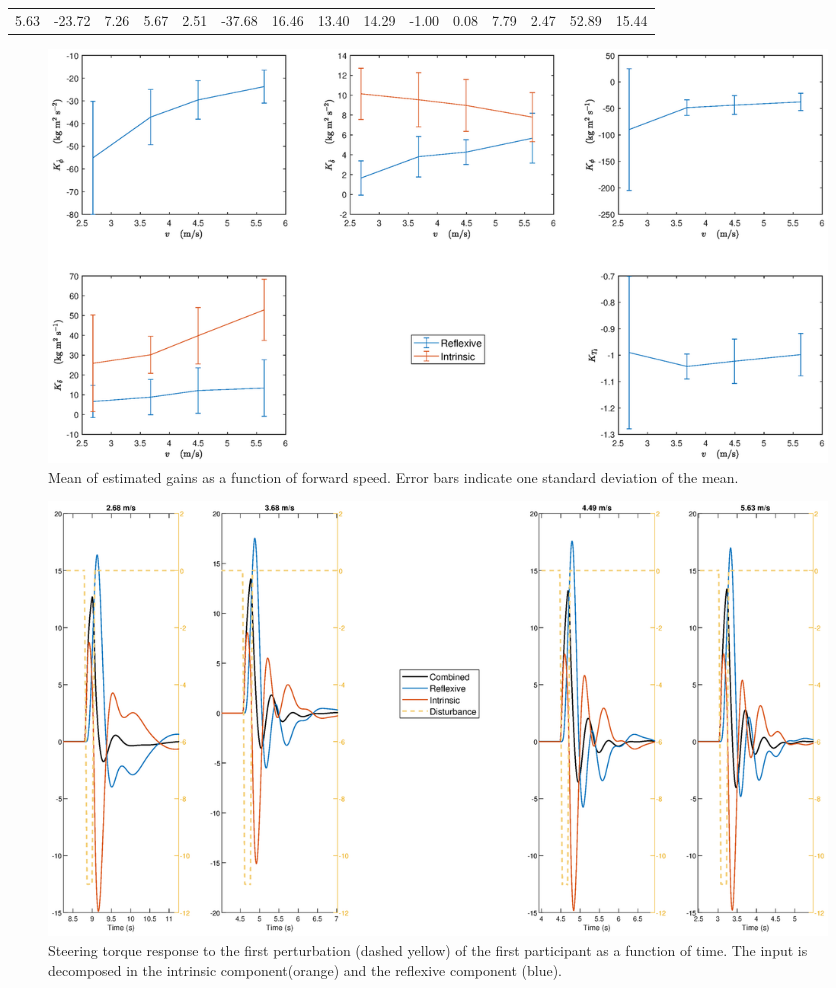 \begin{table}[]
{\begin{tabular}{lllllllllllllll}
        \multicolumn{1}{l|}{5.63} & -23.72                         & 7.26                            & 5.67                           & 2.51                              & -37.68                       & 16.46                         & 13.40                           & 14.29                              & -1.00                 & 0.08                    & 7.79                              & 2.47                                 & 52.89                           & 15.44                             
        \end{tabular}%
        }
        \label{tb:steer_gains}
        \end{table}
\begin{figure}[h!]
    \centering

    \includegraphics[width=\linewidth]{images/steer_irf/param_gains_plot.eps}
    \caption{Mean of estimated gains as a function of forward speed. Error bars indicate one standard deviation of the mean.}
    \label{fig:gain_plots_steer}
\end{figure}

\begin{figure}[h!]
    \centering

    \includegraphics[width=\linewidth]{images/steer_irf/param_input.eps}
    \caption{Steering torque response to the first perturbation (dashed yellow) of the first participant as a function of time. The input is decomposed in the intrinsic component(orange) and the reflexive component (blue). }
    \label{fig:param_input}
\end{figure}
